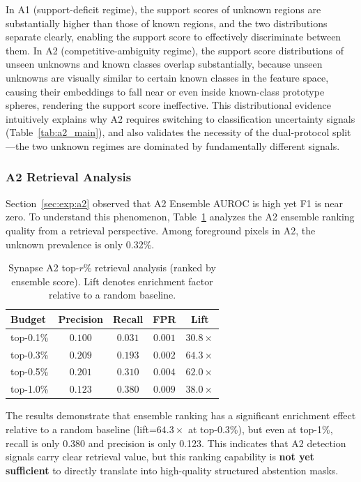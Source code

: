 \documentclass[3p,twocolumn,authoryear]{elsarticle}
\begin{document}
In A1 (support-deficit regime), the support scores of unknown regions are substantially
higher than those of known regions, and the two distributions separate clearly, enabling
the support score to effectively discriminate between them.
In A2 (competitive-ambiguity regime), the support score distributions of unseen unknowns
and known classes overlap substantially, because unseen unknowns are visually similar to
certain known classes in the feature space, causing their embeddings to fall near or even
inside known-class prototype spheres, rendering the support score ineffective.
This distributional evidence intuitively explains why A2 requires switching to
classification uncertainty signals (Table~\ref{tab:a2_main}), and also validates the
necessity of the dual-protocol split---the two unknown regimes are dominated by
fundamentally different signals.

\subsubsection{A2 Retrieval Analysis}\label{sec:exp:analysis:retrieval}

Section~\ref{sec:exp:a2} observed that A2 Ensemble AUROC is high yet F1 is near zero.
To understand this phenomenon, Table~\ref{tab:retrieval} analyzes the A2 ensemble
ranking quality from a retrieval perspective.
Among foreground pixels in A2, the unknown prevalence is only 0.32\%.

\begin{table}[t]
\centering
\caption{Synapse A2 top-$r$\% retrieval analysis (ranked by ensemble score).
Lift denotes enrichment factor relative to a random baseline.}\label{tab:retrieval}
\begin{tabular}{lcccc}
\toprule
Budget & Precision & Recall & FPR & Lift \\
\midrule
top-0.1\% & $0.100$ & $0.031$ & $0.001$ & $30.8\times$ \\
top-0.3\% & $0.209$ & $0.193$ & $0.002$ & $64.3\times$ \\
top-0.5\% & $0.201$ & $0.310$ & $0.004$ & $62.0\times$ \\
top-1.0\% & $0.123$ & $0.380$ & $0.009$ & $38.0\times$ \\
\bottomrule
\end{tabular}
\end{table}

The results demonstrate that ensemble ranking has a significant enrichment effect
relative to a random baseline (lift=$64.3\times$ at top-0.3\%), but even at top-1\%,
recall is only 0.380 and precision is only 0.123.
This indicates that A2 detection signals carry clear retrieval value, but this ranking
capability is \textbf{not yet sufficient} to directly translate into high-quality
structured abstention masks.
\end{document}
